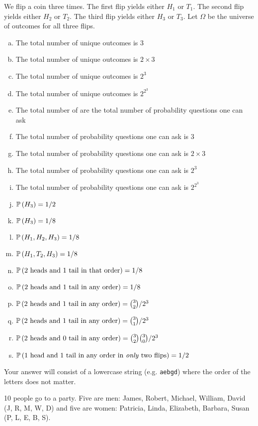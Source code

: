 \documentclass[12pt,landscape]{article}
\newcommand{\instr}{\small Your answer will consist of a lowercase string (e.g. \texttt{aebgd}) where the order of the letters does not matter. \normalsize}
\begin{document}
\problem{} We flip a coin three times. The first flip yields either $H_1$ or $T_1$. The second flip yields either $H_2$ or $T_2$. The third flip yields either $H_3$ or $T_3$. Let $\Omega$ be the universe of outcomes for all three flips.

\vspace{-0.2cm}\benum{} 
\begin{enumerate}[(a)]
\item The total number of unique outcomes is 3
\item The total number of unique outcomes is $2 \times 3$
\item The total number of unique outcomes is $2^3$
\item The total number of unique outcomes is $2^{2^3}$
\item The total number of  are the total number of probability questions one can ask
\item The total number of probability questions one can ask is 3
\item The total number of probability questions one can ask is $2 \times 3$
\item The total number of probability questions one can ask is $2^3$
\item The total number of probability questions one can ask is $2^{2^3}$
\item $\mathbb{P}\left(H_3\right) = 1/2$
\item $\mathbb{P}\left(H_3\right) = 1/8$
\item $\mathbb{P}\left(H_1, H_2, H_3\right) = 1/8$
\item $\mathbb{P}\left(H_1, T_2, H_3\right) = 1/8$
\item $\mathbb{P}\left(\text{2 heads and 1 tail in that order}\right) = 1/8$
\item $\mathbb{P}\left(\text{2 heads and 1 tail in any order}\right) = 1/8$
\item $\mathbb{P}\left(\text{2 heads and 1 tail in any order}\right) = \binom{3}{2}/2^3$
\item $\mathbb{P}\left(\text{2 heads and 1 tail in any order}\right) = \binom{3}{1}/2^3$
\item $\mathbb{P}\left(\text{2 heads and 0 tail in any order}\right) = \binom{3}{2}\binom{3}{0}/2^3$
\item $\mathbb{P}\left(\text{1 head and 1 tail in any order in \emph{only} two flips}\right) = 1/2$
\end{enumerate}
\eenum\instr\pagebreak

\problem{} 10 people go to a party. Five are men: James, Robert, Michael, William, David (J, R, M, W, D) and five are women: Patricia, Linda, Elizabeth, Barbara, Susan (P, L, E, B, S).
\end{document}
